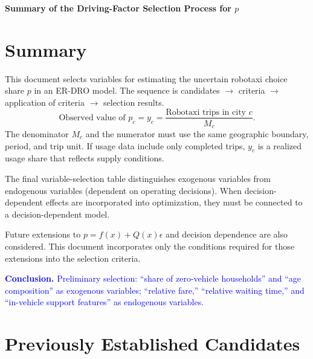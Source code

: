 \documentclass[10pt,a4paper]{article}
\begin{document}
\begin{center}{\Large\bfseries Summary of the Driving-Factor Selection Process for $p$}\end{center}
\section{Summary}
This document selects variables for estimating the uncertain robotaxi choice share $p$ in an ER-DRO model. The sequence is candidates $\rightarrow$ criteria $\rightarrow$ application of criteria $\rightarrow$ selection results.
\[
\text{Observed value of }p_c=y_c=\frac{\text{Robotaxi trips in city }c}{M_c}.
\]
The denominator $M_c$ and the numerator must use the same geographic boundary, period, and trip unit. If usage data include only completed trips, $y_c$ is a realized usage share that reflects supply conditions.

The final variable-selection table distinguishes exogenous variables from endogenous variables (dependent on operating decisions). When decision-dependent effects are incorporated into optimization, they must be connected to a decision-dependent model.

Future extensions to $p=f(x)+Q(x)\epsilon$ and decision dependence are also considered. This document incorporates only the conditions required for those extensions into the selection criteria.

\textcolor{blue}{\textbf{Conclusion.} Preliminary selection: ``share of zero-vehicle households'' and ``age composition'' as exogenous variables; ``relative fare,'' ``relative waiting time,'' and ``in-vehicle support features'' as endogenous variables.}

\section{Previously Established Candidates}
\end{document}
